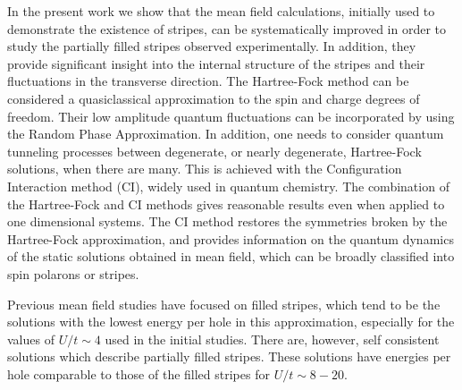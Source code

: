 In the present work we show that the mean field calculations, initially 
used to demonstrate
the existence of stripes, can be systematically improved in order to 
study the partially filled stripes observed experimentally.
In addition, they provide significant insight into the internal
structure of the stripes and their fluctuations in the transverse
direction. The Hartree-Fock method can be considered a quasiclassical
approximation to the spin and charge degrees of freedom.
Their low amplitude quantum fluctuations can be incorporated by using
the Random Phase Approximation\cite{GLV92}. In addition, one 
needs to consider quantum tunneling processes between 
degenerate, or nearly degenerate, Hartree-Fock solutions, 
when there are many. This is achieved with the
Configuration Interaction method (CI), widely used in 
quantum chemistry\cite{LC93,LG98}. The combination of the Hartree-Fock
and CI methods gives reasonable results even when applied to
one dimensional systems\cite{BJ00}. The CI method
restores the symmetries broken by the Hartree-Fock approximation,
and provides information on the quantum dynamics of the
static solutions obtained in mean field, which can
be broadly classified into spin polarons or stripes.

Previous mean field studies have focused on filled stripes\cite{VL91},
which tend to be the solutions with the lowest energy per hole
in this approximation, especially for the
values of $U/t \sim 4$ used in the initial studies\cite{ZG89,PR89,Sc90,VL91}.
There are, however, self consistent
solutions which describe partially filled stripes. These solutions
have energies per hole comparable to those of the filled stripes
for $U/t \sim 8 - 20$. 

